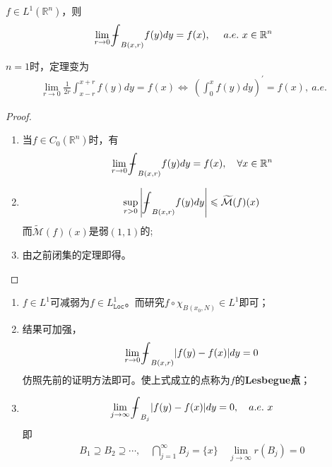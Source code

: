 \begin{theorem}[Lesbegue微分定理]
    $f\in L^1(\mathbb{R}^n)$，则
    \begin{align*}
        \lim\limits_{r\to 0} \bbint_{B(x,r)} f(y) dy = f(x),\quad\  a.e.\ x\in\mathbb{R}^n
    \end{align*}


\end{theorem}
\begin{remark}
    $n=1$时，定理变为
    \begin{align*}
        \lim\limits_{r\to  0} \frac{1}{2r}\int_{x-r}^{x+r} f(y) dy = f(x) \Longleftrightarrow\ \left(\int_0^x f(y) dy\right)^{\prime} = f(x), \ a.e.
    \end{align*}
\end{remark}

\begin{proof}
    \begin{enumerate}[leftmargin=1cm, label=\arabic*${}^{\circ}$]
        \item 当$f\in C_0(\mathbb{R}^n)$时，有
        \begin{align*}
            \lim\limits_{r\to 0} \bbint_{B(x,r)} f(y) dy = f(x),\quad \forall x\in\mathbb{R}^n
        \end{align*}

        \item 
        \begin{align*}
            \sup\limits_{r>0} \left| \bbint_{B(x,r)} f(y) dy\right| \leqslant \widetilde{\mathcal{M}} (f)(x)
        \end{align*}
        而$\widetilde{\mathcal{M}}(f)(x)$是弱$(1,1)$的;

        \item 由之前闭集的定理即得。
    \end{enumerate}
\end{proof}
\begin{remark}[应用1]
    \begin{enumerate}[leftmargin=1cm, label=\arabic*${}^{\circ}$]
        \item $f\in L^1$可减弱为$f\in L^1_{\texttt{Loc}}$。而研究$f\circ \chi_{B(x_0,N)}\in L^1$即可；
        \item 结果可加强，
        \begin{align*}
            \lim\limits_{r\to 0} \bbint_{B(x,r)} |f(y) - f(x)| dy = 0
        \end{align*}
        仿照先前的证明方法即可。使上式成立的点称为$f$的\textbf{Lesbegue点}；
        \item 
        \begin{align*}
            \lim\limits_{j\to \infty} \bbint_{B_j} |f(y) - f(x)| dy = 0,\quad a.e.\ x
        \end{align*}
        即
        \begin{align*}
            B_1 \supseteq B_2 \supseteq \cdots, \quad \bigcap\limits_{j=1}^{\infty} B_j = \{x\} \quad \lim\limits_{j\to\infty} r(B_j) = 0
        \end{align*}
    \end{enumerate}
\end{remark}


